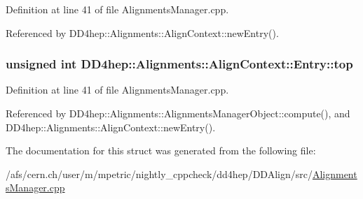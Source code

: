 Definition at line 41 of file AlignmentsManager.cpp.

Referenced by DD4hep::Alignments::AlignContext::newEntry().\hypertarget{struct_d_d4hep_1_1_alignments_1_1_align_context_1_1_entry_aa5d088f1704ee169e740e841721f2b2e}{
\subsubsection[{top}]{\setlength{\rightskip}{0pt plus 5cm}unsigned int {\bf DD4hep::Alignments::AlignContext::Entry::top}}}
\label{struct_d_d4hep_1_1_alignments_1_1_align_context_1_1_entry_aa5d088f1704ee169e740e841721f2b2e}


Definition at line 41 of file AlignmentsManager.cpp.

Referenced by DD4hep::Alignments::AlignmentsManagerObject::compute(), and DD4hep::Alignments::AlignContext::newEntry().

The documentation for this struct was generated from the following file:\begin{DoxyCompactItemize}
\item 
/afs/cern.ch/user/m/mpetric/nightly\_\-cppcheck/dd4hep/DDAlign/src/\hyperlink{_alignments_manager_8cpp}{AlignmentsManager.cpp}\end{DoxyCompactItemize}
